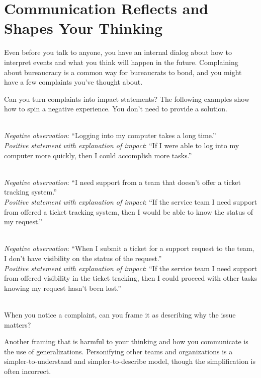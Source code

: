
\section{Communication Reflects and Shapes Your Thinking}

Even before you talk to anyone, you have an internal dialog about how to interpret events and what you think will happen in the future. Complaining about bureaucracy is a common way for bureaucrats to bond, and you might have a few complaints you've thought about.

Can you turn complaints into impact statements? 
The following examples show how to spin a negative experience. You don't need to provide a solution. 

\ \\
\textit{Negative observation}: ``Logging into my computer takes a long time.''\\
\textit{Positive statement with explanation of impact}: ``If I were able to log into my computer more quickly, then I could accomplish more tasks.''

\ \\
\textit{Negative observation}: ``I need support from a team that doesn't offer a ticket tracking system.''\\
\textit{Positive statement with explanation of impact}: ``If the service team I need support from offered a ticket tracking system, then I would be able to know the status of my request.''

\ \\
\textit{Negative observation}: ``When I submit a ticket for a support request to the team, I don't have visibility on the status of the request.''\\
\textit{Positive statement with explanation of impact}: ``If the service team I need support from offered visibility in the ticket tracking, then I could proceed with other tasks knowing my request hasn't been lost.''

\ \\
When you notice a complaint, can you frame it as describing why the issue matters? 

Another framing that is harmful to your thinking and how you communicate is the use of generalizations. Personifying other teams and organizations is a simpler-to-understand and simpler-to-describe model, though the simplification is often incorrect. 

